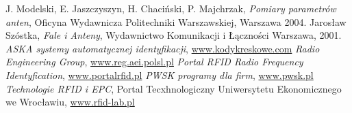 \begin{thebibliography}{99}
%
J. Modelski, E. Jaszczyszyn, H. Chaciński, P. Majchrzak, \emph{Pomiary parametrów anten}, Oficyna Wydawnicza Politechniki Warszawskiej, Warszawa 2004.  
%
Jarosław Szóstka, \emph{Fale i Anteny}, Wydawnictwo Komunikacji i Łączności Warszawa, 
2001.
%
\emph{ASKA systemy automatycznej identyfikacji}, \url{www.kodykreskowe.com}
%
\emph{Radio Engineering Group}, \url{www.reg.aei.polsl.pl}
%
\emph{Portal RFID Radio Frequency Identyfication}, \url{www.portalrfid.pl}
%
\emph{PWSK programy dla firm}, \url{www.pwsk.pl}
%
\emph{Technologie RFID i EPC}, Portal Tecxhnologiczny Uniwersytetu Ekonomicznego we Wrocławiu, \url{www.rfid-lab.pl}
\end{thebibliography}
